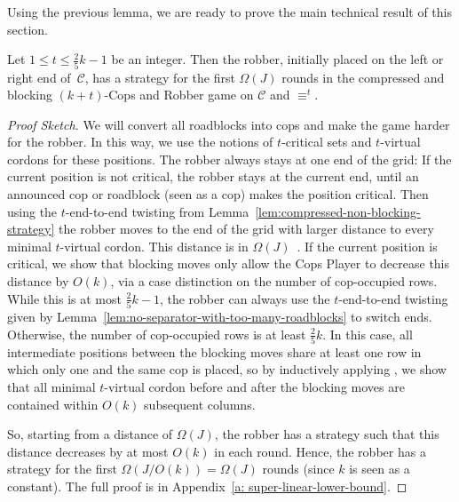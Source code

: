 \documentclass[a4paper,english, thm-restate]{lipics-v2021}
\newcommand{\comp}{\equiv}
\newcommand{\grid}{\mathcal{C}}
\newcommand{\ifAppendix}[1]{#1}
\begin{document}
\noindent Using the previous lemma, we are ready to prove the main technical result of this section.
%
%

\begin{lemma}
        \label{lem:compression-lower-bound-blocking}
        Let $1\leq t \leq \frac{2}{5}k -1$ be an integer.
        Then the robber, initially placed on the left or right end of~$\grid$,
        has a strategy for the first $\Omega(J)$
        rounds in the compressed and blocking $(k+t)$-Cops and Robber game
        on $\grid$ and $\comp^t$.
\end{lemma}
\begin{proof}[Proof Sketch] 
        We will convert all roadblocks into cops
        and make the game harder for the robber. 
        In this way, we use the notions of $t$-critical sets
        and $t$-virtual cordons for these positions.
        The robber always stays at one end of the grid:
         If the current position is not critical, the robber stays at the current end, until an announced cop or roadblock (seen as a cop)
                makes the position critical.
                Then using the $t$-end-to-end twisting from Lemma~\ref{lem:compressed-non-blocking-strategy} the robber moves
                to the end of the grid
                with larger distance to every minimal $t$-virtual cordon.
                This distance is in $\Omega(J)$~\cite{RFJN024}.
        If the current position is critical, we show that 
                blocking moves only allow the Cops Player to decrease this distance by $O(k)$, via
a case distinction on the number of cop-occupied rows.
                While this is at most $\frac{2}{5}k-1$,
                the robber can always use the $t$-end-to-end twisting given by Lemma~\ref{lem:no-separator-with-too-many-roadblocks} to switch ends.
                 Otherwise, the number of cop-occupied rows is at least $\frac{2}{5}k$. In this case, all intermediate positions between the blocking moves
                share at least one row in which only one and the same cop is placed, so
                by inductively applying \cite[Proposition 4.10]{RFJN024},
                we  show that all minimal  $t$-virtual cordon before and after the blocking moves are contained within $O(k)$ subsequent columns. 
                
        So, starting from a distance of $\Omega(J)$,
        the robber has a strategy such that this distance decreases by at most $O(k)$ in each round.
        Hence, the robber has a strategy for the first
      $\Omega(J/O(k))=\Omega(J)$ rounds (since $k$ is seen as a constant).
      \ifAppendix{The full proof is in Appendix~\ref{a: super-linear-lower-bound}.}
 \end{proof}
\end{document}

